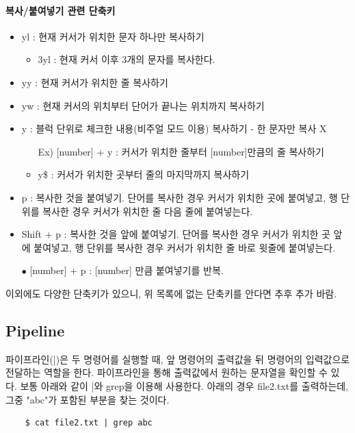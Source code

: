 \paragraph{복사/붙여넣기 관련 단축키}
\begin{itemize}[$\bullet$]
    \item yl : 현재 커서가 위치한 문자 하나만 복사하기
        \begin{itemize}[Ex)]
            \item 3yl : 현재 커서 이후 3개의 문자를 복사한다.
        \end{itemize}
    \item yy : 현재 커서가 위치한 줄 복사하기
    \item yw : 현재 커서의 위치부터 단어가 끝나는 위치까지 복사하기
    \item y : 블럭 단위로 체크한 내용(비주얼 모드 이용) 복사하기 - 한 문자만 복사 X
        \begin{itemize}[Ex)]
            \item[Ex)] [number] + y : 커서가 위치한 줄부터 [number]만큼의 줄 복사하기
            \item y\$ : 커서가 위치한 곳부터 줄의 마지막까지 복사하기
        \end{itemize}
    \item p : 복사한 것을 붙여넣기. 단어를 복사한 경우 커서가 위치한 곳에 붙여넣고, 행 단위를 복사한 경우 커서가 위치한 줄 다음 줄에 붙여넣는다.
    \item Shift + p : 복사한 것을 앞에 붙여넣기. 단어를 복사한 경우 커서가 위치한 곳 앞에 붙여넣고, 행 단위를 복사한 경우 커서가 위치한 줄 바로 윗줄에 붙여넣는다.
    \item[$\bullet$] [number] + p : [number] 만큼 붙여넣기를 반복.
\end{itemize}

이외에도 다양한 단축키가 있으니, 위 목록에 없는 단축키를 안다면 추후 추가 바람.

\subsection{Pipeline}
파이프라인(|)은 두 명령어를 실행할 때, 앞 명령어의 출력값을 뒤 명령어의 입력값으로 전달하는 역할을 한다. 파이프라인을 통해 출력값에서 원하는 문자열을 확인할 수 있다. 보통 아래와 같이 |와 grep을 이용해 사용한다. 아래의 경우 file2.txt를 출력하는데, 그중 "abc"가 포함된 부분을 찾는 것이다.
    \begin{lstlisting}
    $ cat file2.txt | grep abc
    \end{lstlisting}
